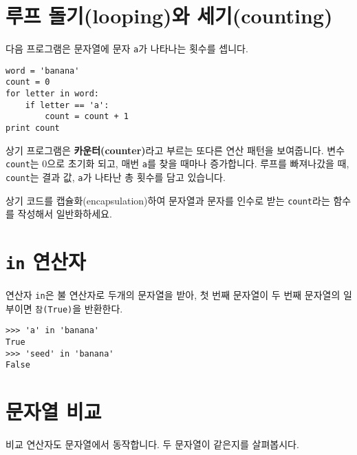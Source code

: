
\section{루프 돌기(looping)와 세기(counting)}
\label{counter}


다음 프로그램은 문자열에 문자 {\tt a}가 나타나는 횟수를 셉니다.

\beforeverb
\begin{verbatim}
word = 'banana'
count = 0
for letter in word:
    if letter == 'a':
        count = count + 1
print count
\end{verbatim}
\afterverb
%

상기 프로그램은 {\bf 카운터(counter)}라고 부르는 또다른 연산 패턴을 보여줍니다. 
변수 {\tt count}는 0으로 초기화 되고, 매번 {\tt a}를 찾을 때마나 증가합니다.
루프를 빠져나갔을 때, {\tt count}는 결과 값, {\tt a}가 나타난 총 횟수를 담고 있습니다.

\begin{ex}

상기 코드를 캡슐화(encapsulation)하여 문자열과 문자를 인수로 받는 {\tt count}라는 함수를 작성해서 일반화하세요.

\end{ex}

\section{{\tt in} 연산자}
\label{inboth}


연산자 {\tt in}은 불 연산자로 두개의 문자열을 받아, 첫 번째 문자열이 두 번째 문자열의 일부이면 {\tt 참(True)}을 반환한다.

\beforeverb
\begin{verbatim}
>>> 'a' in 'banana'
True
>>> 'seed' in 'banana'
False
\end{verbatim}
\afterverb
%

\section{문자열 비교}


비교 연산자도 문자열에서 동작합니다. 두 문자열이 같은지를 살펴봅시다.

